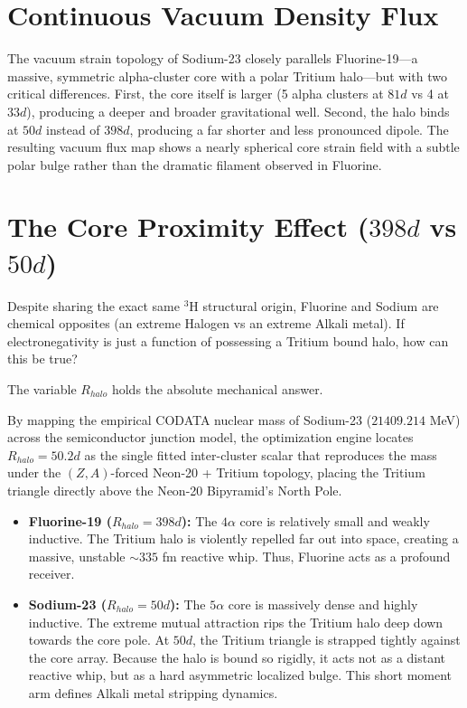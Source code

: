 \section{Continuous Vacuum Density Flux}
The vacuum strain topology of Sodium-23 closely parallels Fluorine-19---a massive, symmetric alpha-cluster core with a polar Tritium halo---but with two critical differences. First, the core itself is larger (5 alpha clusters at $81d$ vs 4 at $33d$), producing a deeper and broader gravitational well. Second, the halo binds at $50d$ instead of $398d$, producing a far shorter and less pronounced dipole. The resulting vacuum flux map shows a nearly spherical core strain field with a subtle polar bulge rather than the dramatic filament observed in Fluorine.

\section{The Core Proximity Effect ($398d$ vs $50d$)}
Despite sharing the exact same $^3\text{H}$ structural origin, Fluorine and Sodium are chemical opposites (an extreme Halogen vs an extreme Alkali metal). If electronegativity is just a function of possessing a Tritium bound halo, how can this be true?

The variable $R_{halo}$ holds the absolute mechanical answer.

By mapping the empirical CODATA nuclear mass of Sodium-23 ($21409.214$ MeV) across the semiconductor junction model, the optimization engine locates $R_{halo} = 50.2d$ as the single fitted inter-cluster scalar that reproduces the mass under the $(Z,A)$-forced Neon-20 + Tritium topology, placing the Tritium triangle directly above the Neon-20 Bipyramid's North Pole.

\begin{itemize}
    \item \textbf{Fluorine-19 ($R_{halo} = 398d$):} The $4\alpha$ core is relatively small and weakly inductive. The Tritium halo is violently repelled far out into space, creating a massive, unstable $\sim335$ fm reactive whip. Thus, Fluorine acts as a profound receiver.
    \item \textbf{Sodium-23 ($R_{halo} = 50d$):} The $5\alpha$ core is massively dense and highly inductive. The extreme mutual attraction rips the Tritium halo deep down towards the core pole. At $50d$, the Tritium triangle is strapped tightly against the core array. Because the halo is bound so rigidly, it acts not as a distant reactive whip, but as a hard asymmetric localized bulge. This short moment arm defines Alkali metal stripping dynamics.
\end{itemize}

